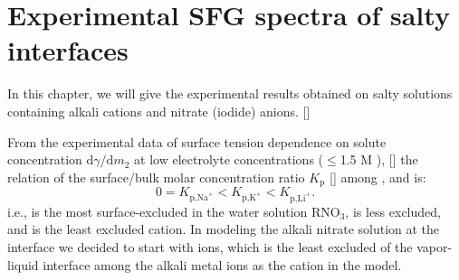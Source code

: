 \chapter{Experimental SFG spectra of salty interfaces}\label{CHAPTER_SFG_Exp}
In this chapter, we will give the experimental results obtained on salty solutions containing alkali cations and nitrate (iodide) anions. [\cite{PS03,AJ12,HuaWei2014}] 

From the experimental data of surface tension dependence on solute concentration $\text{d}\gamma/\text{d}m_2$ 
at low electrolyte concentrations ($\leq$1.5 M ), [\cite{Weissenborn95,Hey81,Jarvis68,Jarvis72}] 
the relation of the surface/bulk molar concentration ratio $K_{\text{p}}$ [\cite{Pegram06}] among \li, \Na and \K is: 
\begin{equation}
0=K_{\text{p,Na}^+}< K_{\text{p,K}^+}< K_{\text{p,Li}^+}.
\label{eq:bscr}
\end{equation}
i.e., \Na is the most surface-excluded in the water solution RNO$_3$, \K is less excluded, 
and \Li is the least excluded cation.
In modeling the alkali nitrate solution at the interface we decided to start with \Li ions, which is the least excluded of the vapor-liquid interface 
among the alkali metal ions as the cation in the model. 
%
%

